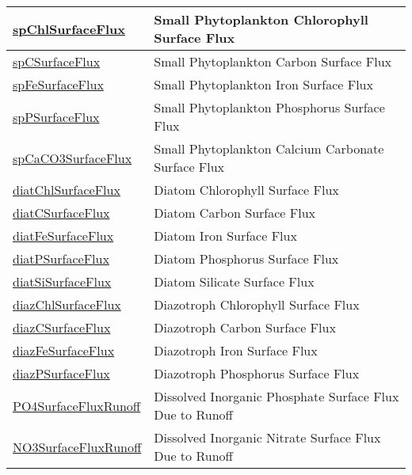 {\begin{center}
\begin{longtable}{| p{2.0in} | p{4.0in} |}
    \hline
    \hyperref[subsec:var_sec_forcing_spChlSurfaceFlux]{spChlSurfaceFlux} & Small Phytoplankton Chlorophyll Surface Flux \\
    \hline
    \hyperref[subsec:var_sec_forcing_spCSurfaceFlux]{spCSurfaceFlux} & Small Phytoplankton Carbon Surface Flux \\
    \hline
    \hyperref[subsec:var_sec_forcing_spFeSurfaceFlux]{spFeSurfaceFlux} & Small Phytoplankton Iron Surface Flux \\
    \hline
    \hyperref[subsec:var_sec_forcing_spPSurfaceFlux]{spPSurfaceFlux} & Small Phytoplankton Phosphorus Surface Flux \\
    \hline
    \hyperref[subsec:var_sec_forcing_spCaCO3SurfaceFlux]{spCaCO3SurfaceFlux} & Small Phytoplankton Calcium Carbonate Surface Flux \\
    \hline
    \hyperref[subsec:var_sec_forcing_diatChlSurfaceFlux]{diatChlSurfaceFlux} & Diatom Chlorophyll Surface Flux \\
    \hline
    \hyperref[subsec:var_sec_forcing_diatCSurfaceFlux]{diatCSurfaceFlux} & Diatom Carbon Surface Flux \\
    \hline
    \hyperref[subsec:var_sec_forcing_diatFeSurfaceFlux]{diatFeSurfaceFlux} & Diatom Iron Surface Flux \\
    \hline
    \hyperref[subsec:var_sec_forcing_diatPSurfaceFlux]{diatPSurfaceFlux} & Diatom Phosphorus Surface Flux \\
    \hline
    \hyperref[subsec:var_sec_forcing_diatSiSurfaceFlux]{diatSiSurfaceFlux} & Diatom Silicate Surface Flux \\
    \hline
    \hyperref[subsec:var_sec_forcing_diazChlSurfaceFlux]{diazChlSurfaceFlux} & Diazotroph Chlorophyll Surface Flux \\
    \hline
    \hyperref[subsec:var_sec_forcing_diazCSurfaceFlux]{diazCSurfaceFlux} & Diazotroph Carbon Surface Flux \\
    \hline
    \hyperref[subsec:var_sec_forcing_diazFeSurfaceFlux]{diazFeSurfaceFlux} & Diazotroph Iron Surface Flux \\
    \hline
    \hyperref[subsec:var_sec_forcing_diazPSurfaceFlux]{diazPSurfaceFlux} & Diazotroph Phosphorus Surface Flux \\
    \hline
    \hyperref[subsec:var_sec_forcing_PO4SurfaceFluxRunoff]{PO4SurfaceFluxRunoff} & Dissolved Inorganic Phosphate Surface Flux Due to Runoff \\
    \hline
    \hyperref[subsec:var_sec_forcing_NO3SurfaceFluxRunoff]{NO3SurfaceFluxRunoff} & Dissolved Inorganic Nitrate Surface Flux Due to Runoff \\

\end{longtable}
\end{center}}
